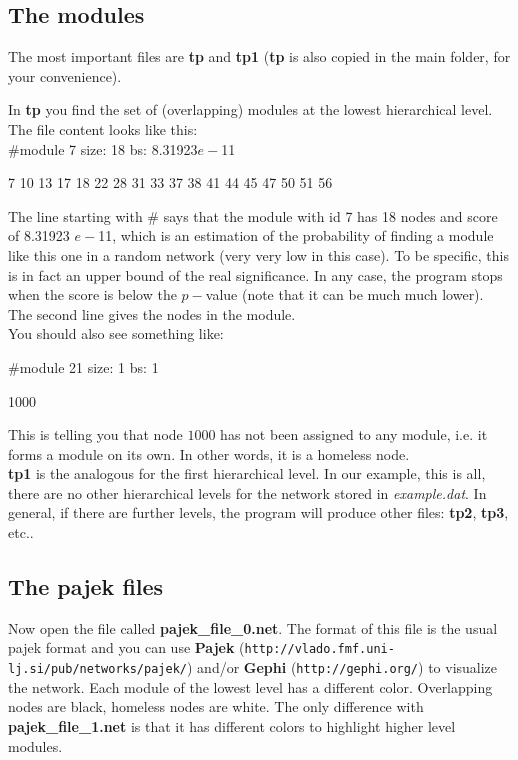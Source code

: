 \documentclass[11pt]{article}
\begin{document}
\subsection{The modules}
\label{sec2.1}

The most important files are \textbf{tp} and \textbf{tp1} (\textbf{tp} is also copied in the main folder, for your convenience).

In \textbf{tp} you find the set of (overlapping) modules at the lowest hierarchical level. The file content looks like this:
\\

\#module 7 size: 18 bs: 8.31923$e-$11

7 10 13 17 18 22 28 31 33 37 38 41 44 45 47 50 51 56


{\footnotesize The line starting with \# says that the module with id 7 has 18
nodes 
and score of 8.31923 $e-$11, which is an estimation of 
the probability of finding a module 
like this one in a random network (very very low in this case). To be specific, this is in fact an upper bound of the real significance. In any case, 
the program stops when the score is below the $p-$value (note that it can be much much lower). 
The second line gives the nodes in the module.}
\\

You should also see something like:

\#module 21 size: 1 bs: 1

1000

{\footnotesize This is telling you that node $1000$ has not been
  assigned to any module, i.e. it forms a module on its own. In other words, it is a homeless node.}
\\

\textbf{tp1} is the analogous for the first hierarchical level. In our example, this is all, there are no other hierarchical levels for the network stored
in {\it example.dat}. In general, if there are further levels, the
program will produce other files: {\bf tp2}, {\bf tp3}, etc..
\\

\subsection{The pajek files}


Now open the file called \textbf{pajek\_file\_0.net}. The format of
this file is the usual pajek format and you can use {\bf Pajek}
({\tt http://vlado.fmf.uni-lj.si/pub/networks/pajek/}) and/or {\bf Gephi}
({\tt http://gephi.org/}) to visualize the network. 
Each module of the lowest level has a different color. Overlapping nodes are
black, homeless nodes are white. 
The only difference with \textbf{pajek\_file\_1.net} is that it has different colors to highlight higher level modules.
\end{document}
